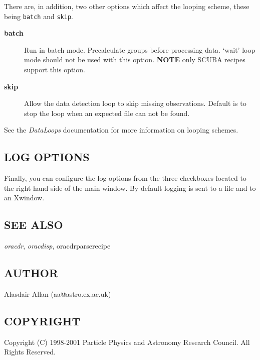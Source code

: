 \documentclass[twoside,11pt]{article}
\renewcommand{\_}{\texttt{\symbol{95}}}
\begin{document}
There are, in addition, two other options which affect the looping
scheme, these being \texttt{batch} and \texttt{skip}.

\begin{description}

\item[{\textbf{batch}}] \mbox{}

Run in batch mode. Precalculate groups before processing data. `wait'
loop mode should not be used with this option.  \textbf{NOTE} only SCUBA
recipes support this option.


\item[{\textbf{skip}}] \mbox{}

Allow the data detection loop to skip missing observations. Default is
to stop the loop when an expected file can not be found.

\end{description}


See the \emph{DataLoops} documentation for more information on looping
schemes.

\subsection*{LOG OPTIONS\label{Xoracdr_LOG_OPTIONS}}


Finally, you can configure the log options from the three checkboxes
located to the right hand side of the main window. By default logging
is sent to a file and to an Xwindow.

\subsection*{SEE ALSO\label{Xoracdr_SEE_ALSO}}


\emph{oracdr}, \emph{oracdisp}, \textsf{oracdr\_parse\_recipe}

\subsection*{AUTHOR\label{Xoracdr_AUTHOR}}


Alasdair Allan (aa@astro.ex.ac.uk)

\subsection*{COPYRIGHT\label{Xoracdr_COPYRIGHT}}


Copyright (C) 1998-2001 Particle Physics and Astronomy Research Council.
All Rights Reserved.
\end{document}
